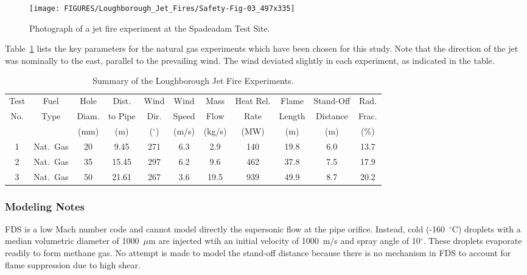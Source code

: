\begin{figure}[!ht]
\texttt{[image: FIGURES/Loughborough\_Jet\_Fires/Safety-Fig-03\_497x335]}
\caption[Photograph of a jet fire experiment at the Spadeadam Test Site]{Photograph of a jet fire experiment at the Spadeadam Test Site.}
\label{jet_photo}
\end{figure}

Table~\ref{Loughborough_Parameters} lists the key parameters for the natural gas experiments which have been chosen for this study. Note that the direction of the jet was nominally to the east, parallel to the prevailing wind. The wind deviated slightly in each experiment, as indicated in the table.

\begin{table}[!ht]
\caption[Summary of the Loughborough Jet Fire Experiments]{Summary of the Loughborough Jet Fire Experiments.}
\begin{tabular}{|c|c|c|c|c|c|c|c|c|c|c|}
\hline
Test    & Fuel     & Hole  & Dist.    & Wind          & Wind    & Mass   & Heat Rel.    & Flame     & Stand-Off  & Rad.      \\
No.     & Type     & Diam. & to Pipe  & Dir.          & Speed   & Flow   & Rate         & Length    & Distance   & Frac.     \\
        &          & (mm)  & (m)      & ($^\circ$)    & (m/s)   & (kg/s) & (MW)         & (m)       & (m)        & (\%)      \\ \hline
1       & Nat.~Gas & 20    & 9.45     & 271           & 6.3     & 2.9    & 140          & 19.8      & 6.0        & 13.7      \\
2       & Nat.~Gas & 35    & 15.45    & 297           & 6.2     & 9.6    & 462          & 37.8      & 7.5        & 17.9      \\
3       & Nat.~Gas & 50    & 21.61    & 267           & 3.6     & 19.5   & 939          & 49.9      & 8.7        & 20.2      \\ \hline
\end{tabular}
\label{Loughborough_Parameters}
\end{table}

\subsubsection{Modeling Notes}

FDS is a low Mach number code and cannot model directly the supersonic flow at the pipe orifice. Instead, cold (-160~$^\circ$C) droplets with a median volumetric diameter of 1000~$\mu$m are injected wtih an initial velocity of 1000~m/s and spray angle of 10$^\circ$. These droplets evaporate readily to form methane gas. No attempt is made to model the stand-off distance because there is no mechanism in FDS to account for flame suppression due to high shear.

